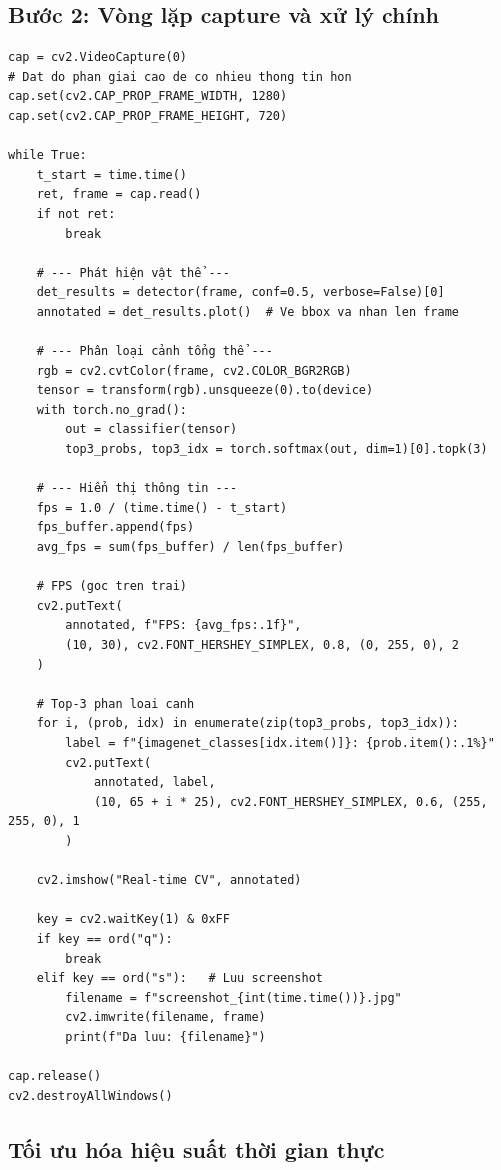 \subsection{Bước 2: Vòng lặp capture và xử lý chính}
\label{subsec:rt_main_loop}

\begin{verbatim}
cap = cv2.VideoCapture(0)
# Dat do phan giai cao de co nhieu thong tin hon
cap.set(cv2.CAP_PROP_FRAME_WIDTH, 1280)
cap.set(cv2.CAP_PROP_FRAME_HEIGHT, 720)

while True:
    t_start = time.time()
    ret, frame = cap.read()
    if not ret:
        break

    # --- Phát hiện vật thể ---
    det_results = detector(frame, conf=0.5, verbose=False)[0]
    annotated = det_results.plot()  # Ve bbox va nhan len frame

    # --- Phân loại cảnh tổng thể ---
    rgb = cv2.cvtColor(frame, cv2.COLOR_BGR2RGB)
    tensor = transform(rgb).unsqueeze(0).to(device)
    with torch.no_grad():
        out = classifier(tensor)
        top3_probs, top3_idx = torch.softmax(out, dim=1)[0].topk(3)

    # --- Hiển thị thông tin ---
    fps = 1.0 / (time.time() - t_start)
    fps_buffer.append(fps)
    avg_fps = sum(fps_buffer) / len(fps_buffer)

    # FPS (goc tren trai)
    cv2.putText(
        annotated, f"FPS: {avg_fps:.1f}",
        (10, 30), cv2.FONT_HERSHEY_SIMPLEX, 0.8, (0, 255, 0), 2
    )

    # Top-3 phan loai canh
    for i, (prob, idx) in enumerate(zip(top3_probs, top3_idx)):
        label = f"{imagenet_classes[idx.item()]}: {prob.item():.1%}"
        cv2.putText(
            annotated, label,
            (10, 65 + i * 25), cv2.FONT_HERSHEY_SIMPLEX, 0.6, (255, 255, 0), 1
        )

    cv2.imshow("Real-time CV", annotated)

    key = cv2.waitKey(1) & 0xFF
    if key == ord("q"):
        break
    elif key == ord("s"):   # Luu screenshot
        filename = f"screenshot_{int(time.time())}.jpg"
        cv2.imwrite(filename, frame)
        print(f"Da luu: {filename}")

cap.release()
cv2.destroyAllWindows()
\end{verbatim}

\subsection{Tối ưu hóa hiệu suất thời gian thực}
\label{subsec:rt_optimization}

